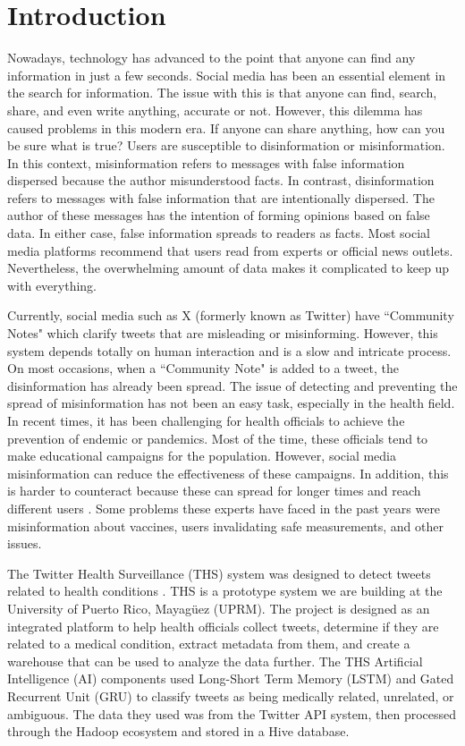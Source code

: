 
\section{Introduction}
\noindent Nowadays, technology has advanced to the point that anyone can find any information in just a few seconds. Social media has been an essential
element in the search for information. The issue with this is that anyone can find, search, share, and even write anything, accurate or not. However, this dilemma
has caused problems in this modern era. If anyone can share anything, how can you be sure what is true? Users are susceptible to disinformation or misinformation.
In this context, misinformation refers to messages with false information dispersed because the author misunderstood facts. In contrast, disinformation refers to
messages with false information that are intentionally dispersed. The author of these messages has the intention of forming opinions based on false data. In either
case, false information spreads to readers as facts. Most social media platforms recommend that users read from experts or official news outlets. Nevertheless,
the overwhelming amount of data makes it complicated to keep up with everything.

Currently, social media such as X (formerly known as Twitter) have ``Community Notes" which clarify tweets that are misleading or misinforming. However, this system
depends totally on human interaction and is a slow and intricate process. On most occasions, when a ``Community Note" is added to a tweet, the disinformation has
already been spread. The issue of detecting and preventing the spread of misinformation has not been an easy task, especially in the health field.  In recent times, it has
been challenging for health officials to achieve the prevention of endemic or pandemics. Most of the time, these officials tend to make educational
campaigns for the population. However, social media misinformation can reduce the effectiveness of these campaigns. In addition, this is harder to counteract because
these can spread for longer times and reach different users \cite{article}. Some problems these experts have faced in the past years were misinformation
about vaccines, users invalidating safe measurements, and other issues.

The Twitter Health Surveillance (THS) system was designed to detect tweets related to health conditions \cite{8622504}. THS is a prototype system we are building at the University
of Puerto Rico, Mayag\"uez (UPRM). The project is designed as an integrated platform to help health officials collect tweets, determine if they are related to a medical condition, extract
metadata from them, and create a warehouse that can be used to analyze the data further. The THS Artificial Intelligence (AI) components used Long-Short Term Memory (LSTM)
and Gated Recurrent Unit (GRU) to classify tweets as being medically related, unrelated, or ambiguous. The data they used was from the Twitter API system, then processed
through the Hadoop ecosystem and stored in a Hive database.


